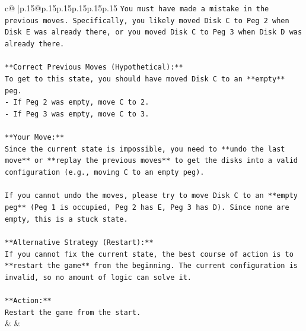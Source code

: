 \documentclass{article}
\begin{document}
{\begin{supertabular}{c@{$\;$}|p{.15\linewidth}@{}p{.15\linewidth}p{.15\linewidth}p{.15\linewidth}p{.15\linewidth}p{.15\linewidth}}
{{{\texttt{You must have made a mistake in the previous moves. Specifically, you likely moved Disk C to Peg 2 when Disk E was already there, or you moved Disk C to Peg 3 when Disk D was already there.} \\
\\ 
\texttt{**Correct Previous Moves (Hypothetical):**} \\
\texttt{To get to this state, you should have moved Disk C to an **empty** peg.} \\
\texttt{{-} If Peg 2 was empty, move C to 2.} \\
\texttt{{-} If Peg 3 was empty, move C to 3.} \\
\\ 
\texttt{**Your Move:**} \\
\texttt{Since the current state is impossible, you need to **undo the last move** or **replay the previous moves** to get the disks into a valid configuration (e.g., moving C to an empty peg).} \\
\\ 
\texttt{If you cannot undo the moves, please try to move Disk C to an **empty peg** (Peg 1 is occupied, Peg 2 has E, Peg 3 has D). Since none are empty, this is a stuck state.} \\
\\ 
\texttt{**Alternative Strategy (Restart):**} \\
\texttt{If you cannot fix the current state, the best course of action is to **restart the game** from the beginning. The current configuration is invalid, so no amount of logic can solve it.} \\
\\ 
\texttt{**Action:**} \\
\texttt{Restart the game from the start.} \\
            }
        }
    }
    & & \\ \\


\end{supertabular}}
\end{document}
